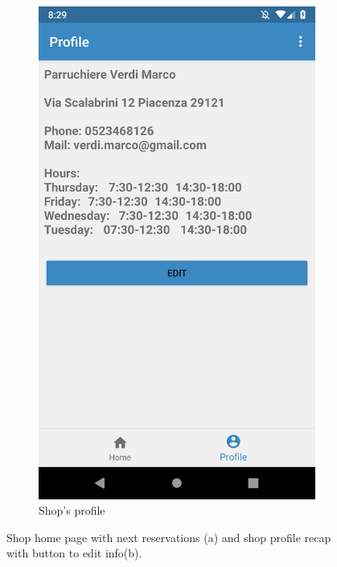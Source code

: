 \begin{figure}[h]
\begin{subfigure}{.5\textwidth}
  \includegraphics[height=.4\textheight, keepaspectratio=true]{Img/Screens/Shop_Profile}
  \caption{Shop's profile}
\end{subfigure}
\caption{Shop home page with next reservations (a) and shop profile recap with button to edit info(b).}
\end{figure}

